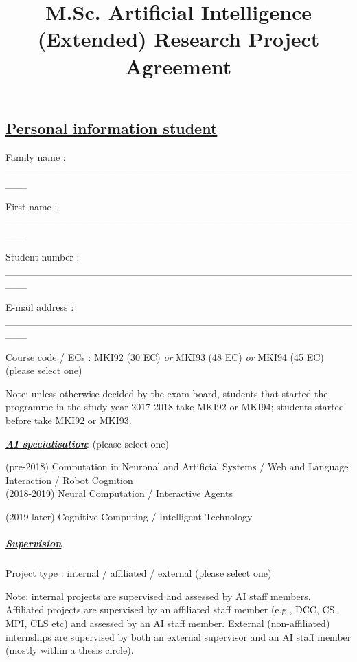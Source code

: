 \documentclass[
]{article}
\title{M.Sc. Artificial Intelligence (Extended) Research Project
Agreement }
\author{}
\date{}
\begin{document}
\maketitle

\hypertarget{personal-information-student}{%
\subsection{\texorpdfstring{\ul{Personal information
student}}{Personal information student}}\label{personal-information-student}}

Family name :
\_\_\_\_\_\_\_\_\_\_\_\_\_\_\_\_\_\_\_\_\_\_\_\_\_\_\_\_\_\_\_\_\_\_\_\_\_\_\_\_\_\_\_\_\_\_\_\_\_\_\_

First name :
\_\_\_\_\_\_\_\_\_\_\_\_\_\_\_\_\_\_\_\_\_\_\_\_\_\_\_\_\_\_\_\_\_\_\_\_\_\_\_\_\_\_\_\_\_\_\_\_\_\_\_

Student number :
\_\_\_\_\_\_\_\_\_\_\_\_\_\_\_\_\_\_\_\_\_\_\_\_\_\_\_\_\_\_\_\_\_\_\_\_\_\_\_\_\_\_\_\_\_\_\_\_\_\_\_

E-mail address :
\_\_\_\_\_\_\_\_\_\_\_\_\_\_\_\_\_\_\_\_\_\_\_\_\_\_\_\_\_\_\_\_\_\_\_\_\_\_\_\_\_\_\_\_\_\_\_\_\_\_\_

Course code / ECs : MKI92 (30 EC) \emph{or} MKI93 (48 EC) \emph{or}
MKI94 (45 EC) (please select one)

Note: unless otherwise decided by the exam board, students that started
the programme in the study year 2017-2018 take MKI92 or MKI94; students
started before take MKI92 or MKI93.

\emph{\textbf{\ul{AI specialisation}}}: (please select one)

(pre-2018) Computation in Neuronal and Artificial Systems / Web and
Language Interaction / Robot Cognition\\
(2018-2019) Neural Computation / Interactive Agents

(2019-later) Cognitive Computing / Intelligent Technology

\hypertarget{supervision}{%
\subparagraph{\texorpdfstring{\textbf{\ul{Supervision}}}{Supervision}}\label{supervision}}

Project type : internal / affiliated / external (please select one)

Note: internal projects are supervised and assessed by AI staff members.
Affiliated projects are supervised by an affiliated staff member (e.g.,
DCC, CS, MPI, CLS etc) and assessed by an AI staff member. External
(non-affiliated) internships are supervised by both an external
supervisor and an AI staff member (mostly within a thesis circle).
\end{document}
